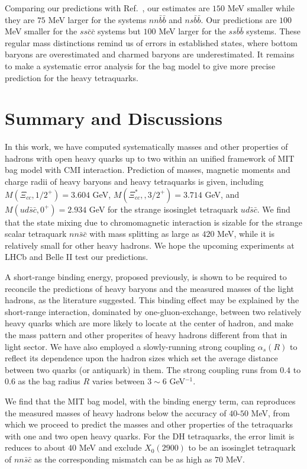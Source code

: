 \documentclass[12pt,onecolumn,floatfix,nofootinbib]{revtex4}
\begin{document}
Comparing our predictions with Ref.~\cite{Lu:2020rog}, our estimates are $%
150 $ MeV smaller while they are $75$ MeV larger for the systems $nn\bar{b}%
\bar{b}$ and $ns\bar{b}\bar{b}$. Our predictions are $100$ MeV smaller for
the $ss\bar{c}\bar{c}$ systems but $100$ MeV larger for the $ss\bar{b}\bar{b}
$ systems. These regular mass distinctions remind us of errors in
established states, where bottom baryons are overestimated and charmed
baryons are underestimated. It remains to make a systematic error analysis
for the bag model to give more precise prediction for the heavy tetraquarks.

\section{Summary and Discussions}

\label{Discussions} In this work, we have computed systematically masses and
other properties of hadrons with open heavy quarks up to two within an
unified framework of MIT bag model with CMI interaction. Prediction of
masses, magnetic moments and charge radii of heavy baryons and heavy
tetraquarks is given, including $M(\Xi _{cc},1/2^{+})=3.604$ GeV, $M(\Xi
_{cc}^{\ast },,3/2^{+})=3.714$ GeV, and $M\left( ud\bar{s}\bar{c}%
,0^{+}\right) =2.934$ GeV for the strange isosinglet tetraquark $ud\bar{s}%
\bar{c}$. We find that the state mixing due to chromomagnetic interaction is
sizable for the strange scalar tetraquark $nn\bar{s}\bar{c}$ with mass
splitting as large as $420$ MeV, while it is relatively small for other
heavy hadrons. We hope the upcoming experiments at LHCb and Belle II test
our predictions.

A short-range binding energy, proposed previously, is shown to be required
to reconcile the predictions of heavy baryons and the measured masses of the
light hadrons, as the literature \cite{KR:2014gca} suggested. This binding
effect may be explained by the short-range interaction, dominated by
one-gluon-exchange, between two relatively heavy quarks which are more
likely to locate at the center of hadron, and make the mass pattern and
other properites of heavy hadrons different from that in light sector. We
have also employed a slowly-running strong coupling $\alpha _{s}(R)$ to
reflect its dependence upon the hadron sizes which set the average distance
between two quarks (or antiquark) in them. The strong coupling runs from $%
0.4 $ to $0.6$ as the bag radius $R$ varies between $3\sim 6$ GeV$^{-1}$.

We find that the MIT bag model, with the binding energy term, can reproduces
the measured masses of heavy hadrons below the accuracy of $40$-$50$ MeV,
from which we proceed to predict the masses and other properties of the
tetraquarks with one and two open heavy quarks. For the DH tetraquarks, the
error limit is reduces to about $40$ MeV and exclude $X_{0}(2900)$ to be an
isosinglet tetraquark of $nn\bar{s}\bar{c}$ as the corresponding mismatch
can be as high as $70$ MeV.
\end{document}

